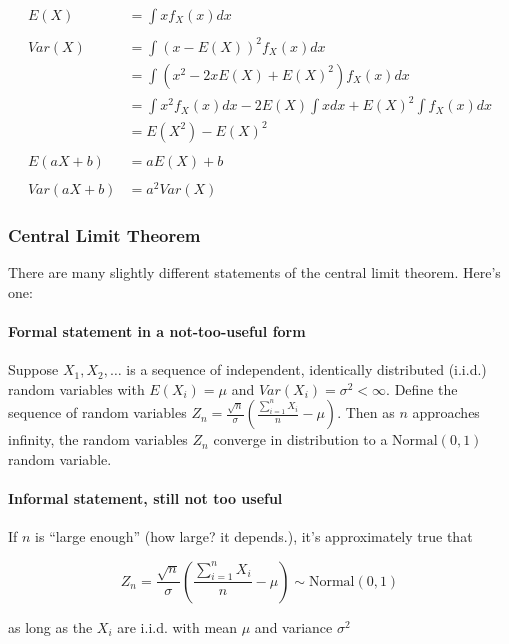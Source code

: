 \documentclass[]{article}
\let\oldparagraph\paragraph
\renewcommand{\paragraph}[1]{\oldparagraph{#1}\mbox{}}
\begin{document}
\begin{align*}
E(X) &= \int x f_X(x) dx \\
&\, \\
Var(X) &= \int (x - E(X))^2 f_X(x) dx \\
 &= \int (x^2 - 2xE(X) + E(X)^2) f_X(x) dx \\
 &= \int x^2f_X(x) dx - 2E(X) \int x dx + E(X)^2 \int f_X(x) dx \\
 &= E(X^2) - E(X)^2 \\
&\, \\
E(aX + b) &= a E(X) + b \\
&\, \\
Var(aX + b) &= a^2 Var(X)
\end{align*}

\newpage

\subsubsection{Central Limit Theorem}\label{central-limit-theorem}

There are many slightly different statements of the central limit
theorem. Here's one:

\paragraph{Formal statement in a not-too-useful
form}\label{formal-statement-in-a-not-too-useful-form}

Suppose \(X_1, X_2, \ldots\) is a sequence of independent, identically
distributed (i.i.d.) random variables with \(E(X_i) = \mu\) and
\(Var(X_i) = \sigma^2 < \infty\). Define the sequence of random
variables
\(Z_n = \frac{\sqrt{n}}{\sigma}\left(\frac{\sum_{i=1}^n X_i}{n} - \mu\right)\).
Then as \(n\) approaches infinity, the random variables \(Z_n\) converge
in distribution to a \(\text{Normal}(0,1)\) random variable.

\paragraph{Informal statement, still not too
useful}\label{informal-statement-still-not-too-useful}

If \(n\) is ``large enough'' (how large? it depends.), it's
approximately true that

\[Z_n = \frac{\sqrt{n}}{\sigma}\left(\frac{\sum_{i=1}^n X_i}{n} - \mu\right) \sim \text{Normal}(0, 1)\]

as long as the \(X_i\) are i.i.d. with mean \(\mu\) and variance
\(\sigma^2\)
\end{document}
